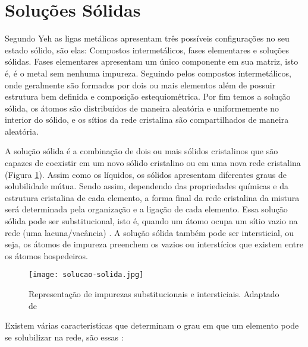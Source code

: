 \section{Soluções Sólidas}\label{sec:LABEL_CHP_1_SEC_A}


Segundo Yeh as ligas metálicas apresentam três possíveis configurações no seu estado sólido, são elas: Compostos intermetálicos, fases elementares e soluções sólidas. Fases elementares apresentam um único componente em sua matriz, isto é, é o metal sem nenhuma impureza. Seguindo pelos compostos intermetálicos, onde geralmente são formados por dois ou mais elementos além de possuir estrutura bem definida e composição estequiométrica. Por fim temos a solução sólida, os átomos são distribuídos de maneira aleatória e uniformemente no interior do sólido, e os sítios da rede cristalina são compartilhados de maneira aleatória. \cite{yeh2013alloy}

A solução sólida é a combinação de dois ou mais sólidos cristalinos que são capazes de coexistir em um novo sólido cristalino ou em uma nova rede cristalina (Figura \ref{fig:solucao-solida}). Assim como os líquidos, os sólidos apresentam diferentes graus de solubilidade mútua. Sendo assim, dependendo das propriedades químicas e da estrutura cristalina de cada elemento, a forma final da rede cristalina da mistura será determinada pela organização e a ligação de cada elemento. Essa solução sólida pode ser substitucional, isto é, quando um átomo ocupa um sítio vazio na rede (uma lacuna/vacância) \cite{britannicaSS}. A solução sólida também pode ser intersticial, ou seja, os átomos de impureza preenchem os vazios ou interstícios que existem entre os átomos hospedeiros.

\begin{figure}[ht]
    \centering
    
    \texttt{[image: solucao-solida.jpg]}
    \caption{Representação de impurezas substitucionais e intersticiais. Adaptado de \cite{callister2011materials}}
    \label{fig:solucao-solida}
\end{figure}

\pagebreak

Existem várias características que determinam o grau em que um elemento pode se solubilizar na rede, são essas \cite{callister2011materials}: 


